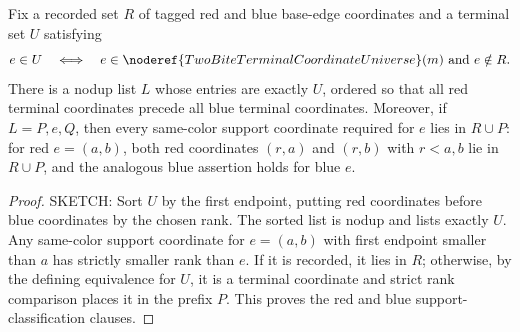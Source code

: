 \begin{helper}
Fix a recorded set \(R\) of tagged red and blue base-edge coordinates and a
terminal set \(U\) satisfying
\[
e\in U
\quad\Longleftrightarrow\quad
e\in\noderef{TwoBiteTerminalCoordinateUniverse}(m)
\hbox{ and } e\notin R.
\]
There is a nodup list \(L\) whose entries are exactly \(U\), ordered so that
all red terminal coordinates precede all blue terminal coordinates.  Moreover,
if \(L=P,e,Q\), then every same-color support coordinate required for \(e\)
lies in \(R\cup P\): for red \(e=(a,b)\), both red coordinates
\((r,a)\) and \((r,b)\) with \(r<a,b\) lie in \(R\cup P\), and the analogous
blue assertion holds for blue \(e\).
\end{helper}
\begin{proof}
SKETCH:
Sort \(U\) by the first endpoint, putting red coordinates before blue
coordinates by the chosen rank.  The sorted list is nodup and lists exactly
\(U\).  Any same-color support coordinate for \(e=(a,b)\) with first endpoint
smaller than \(a\) has strictly smaller rank than \(e\).  If it is recorded,
it lies in \(R\); otherwise, by the defining equivalence for \(U\), it is a
terminal coordinate and strict rank comparison places it in the prefix
\(P\).  This proves the red and blue support-classification clauses.
\end{proof}

